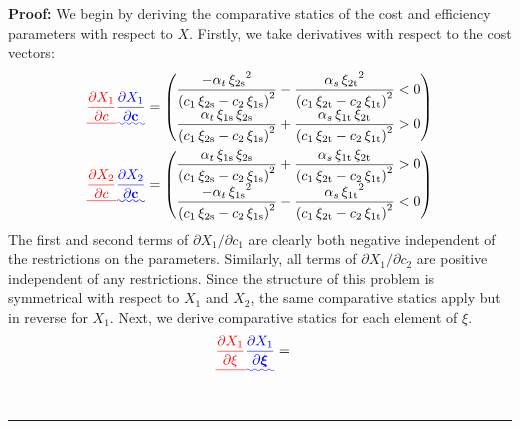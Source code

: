 \documentclass[11pt,a4paper,leqno]{extarticle}
\newenvironment{proof}[1][Proof]{\noindent\textbf{#1:} }{\ \rule{0.5em}{0.5em}}
\providecommand{\DIFadd}[1]{{\protect\color{blue}\uwave{#1}}} %
\providecommand{\DIFdel}[1]{{\protect\color{red}\sout{#1}}}                      %
\providecommand{\DIFaddbegin}{} %
\providecommand{\DIFaddend}{} %
\providecommand{\DIFdelbegin}{} %
\providecommand{\DIFdelend}{} %
\begin{document}
\DIFaddend \begin{proof}
	We begin by deriving the comparative statics of the cost and efficiency parameters with respect to \DIFdelbegin \DIFdel{$X$}\DIFdelend \DIFaddbegin \DIFadd{$\mathbf{X}$}\DIFaddend .   Firstly, we take derivatives with respect to the cost vectors:
	\begin{align*}
	\DIFdelbegin \DIFdel{\frac{\partial X_1}{\partial c} }\DIFdelend \DIFaddbegin \DIFadd{\frac{\partial X_1}{\partial \mathbf{c}} }\DIFaddend &= 
	\begin{pmatrix}
	\dfrac{-\alpha _{t}\,{\xi _{\mathrm{2s}}}^2}{{\left(c_{1}\,\xi _{\mathrm{2s}}-c_{2}\,\xi _{\mathrm{1s}}\right)}^2}-\dfrac{\alpha _{s}\,{\xi _{\mathrm{2t}}}^2}{{\left(c_{1}\,\xi _{\mathrm{2t}}-c_{2}\,\xi _{\mathrm{1t}}\right)}^2}<0 \\
	\dfrac{\alpha _{t}\,\xi _{\mathrm{1s}}\,\xi _{\mathrm{2s}}}{{\left(c_{1}\,\xi _{\mathrm{2s}}-c_{2}\,\xi _{\mathrm{1s}}\right)}^2}+\dfrac{\alpha _{s}\,\xi _{\mathrm{1t}}\,\xi _{\mathrm{2t}}}{{\left(c_{1}\,\xi _{\mathrm{2t}}-c_{2}\,\xi _{\mathrm{1t}}\right)}^2}>0
	\end{pmatrix}\\
	\DIFdelbegin \DIFdel{\frac{\partial X_2}{\partial c} }\DIFdelend \DIFaddbegin \DIFadd{\frac{\partial X_2}{\partial \mathbf{c}} }\DIFaddend &= 
	\begin{pmatrix}
	\dfrac{\alpha _{t}\,\xi _{\mathrm{1s}}\,\xi _{\mathrm{2s}}}{{\left(c_{1}\,\xi _{\mathrm{2s}}-c_{2}\,\xi _{\mathrm{1s}}\right)}^2}+\dfrac{\alpha _{s}\,\xi _{\mathrm{1t}}\,\xi _{\mathrm{2t}}}{{\left(c_{1}\,\xi _{\mathrm{2t}}-c_{2}\,\xi _{\mathrm{1t}}\right)}^2}>0 \\
	\dfrac{-\alpha _{t}\,{\xi _{\mathrm{1s}}}^2}{{\left(c_{1}\,\xi _{\mathrm{2s}}-c_{2}\,\xi _{\mathrm{1s}}\right)}^2}-\dfrac{\alpha _{s}\,{\xi _{\mathrm{1t}}}^2}{{\left(c_{1}\,\xi _{\mathrm{2t}}-c_{2}\,\xi _{\mathrm{1t}}\right)}^2}<0
	\end{pmatrix}
	\end{align*}
	The first and second terms of $\partial X_1 / \partial c_1$ are clearly both negative independent of the restrictions on the parameters. Similarly, all terms of  $\partial X_1 / \partial c_2$ are positive independent of any restrictions. Since the structure of this problem is symmetrical with respect to $X_1$ and $X_2$, the same comparative statics apply but in reverse for $X_1$. Next, we derive comparative statics for each element of $\xi$.
	\begin{alignat*}{1}
	\DIFdelbegin \DIFdel{\frac{\partial X_1}{\partial \xi} }\DIFdelend \DIFaddbegin \DIFadd{\frac{\partial X_1}{\partial \boldsymbol{\xi}} }\DIFaddend &= 

\end{alignat*}
\end{proof}
\end{document}
